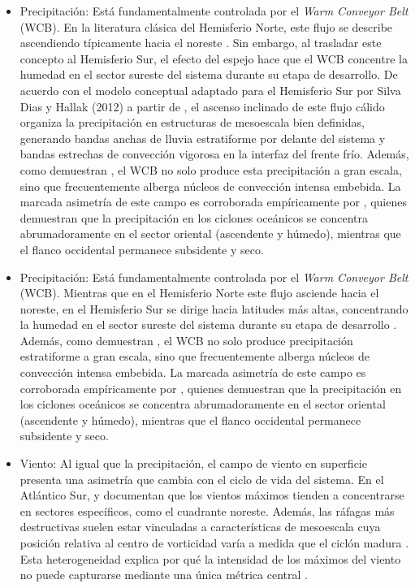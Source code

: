 \begin{itemize}
%
    \item Precipitación: Está fundamentalmente controlada por el \textit{Warm Conveyor Belt} (WCB). En la literatura clásica del Hemisferio Norte, este flujo se describe ascendiendo típicamente hacia el noreste \citep{blanchard2021warm}. Sin embargo, al trasladar este concepto al Hemisferio Sur, el efecto del espejo hace que el WCB concentre la humedad en el sector sureste del sistema durante su etapa de desarrollo. De acuerdo con el modelo conceptual adaptado para el Hemisferio Sur por Silva Dias y Hallak (2012) a partir de \citet{browning1986conceptual}, el ascenso inclinado de este flujo cálido organiza la precipitación en estructuras de mesoescala bien definidas, generando bandas anchas de lluvia estratiforme por delante del sistema y bandas estrechas de convección vigorosa en la interfaz del frente frío. Además, como demuestran \citet{oertel2021warm}, el WCB no solo produce esta precipitación a gran escala, sino que frecuentemente alberga núcleos de convección intensa embebida. La marcada asimetría de este campo es corroborada empíricamente por \citet{naud2020evaluation}, quienes demuestran que la precipitación en los ciclones oceánicos se concentra abrumadoramente en el sector oriental (ascendente y húmedo), mientras que el flanco occidental permanece subsidente y seco.
%
    \item Precipitación: Está fundamentalmente controlada por el \textit{Warm Conveyor Belt} (WCB). Mientras que en el Hemisferio Norte este flujo asciende hacia el noreste, en el Hemisferio Sur se dirige hacia latitudes más altas, concentrando la humedad en el sector sureste del sistema durante su etapa de desarrollo \citep{blanchard2021warm}. Además, como demuestran \citet{oertel2021warm}, el WCB no solo produce precipitación estratiforme a gran escala, sino que frecuentemente alberga núcleos de convección intensa embebida. La marcada asimetría de este campo es corroborada empíricamente por \citet{naud2020evaluation}, quienes demuestran que la precipitación en los ciclones oceánicos se concentra abrumadoramente en el sector oriental (ascendente y húmedo), mientras que el flanco occidental permanece subsidente y seco.
    \item Viento: Al igual que la precipitación, el campo de viento en superficie presenta una asimetría que cambia con el ciclo de vida del sistema. En el Atlántico Sur, \citet{bitencourt2010relating} y \citet{cardoso2022synoptic} documentan que los vientos máximos tienden a concentrarse en sectores específicos, como el cuadrante noreste. Además, las ráfagas más destructivas suelen estar vinculadas a características de mesoescala cuya posición relativa al centro de vorticidad varía a medida que el ciclón madura \citep{eisenstein2023identification}. Esta heterogeneidad explica por qué la intensidad de los máximos del viento no puede capturarse mediante una única métrica central \citep{corner2025classification}.
\end{itemize}

